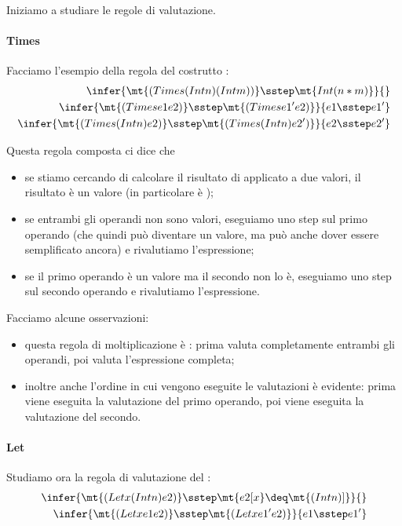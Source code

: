 Iniziamo a studiare le regole di valutazione.
\paragraph{Times} Facciamo l'esempio della regola del costrutto :
\begin{align*}
    \infer{
        \mt{(Times (Int n) (Int m))} \sstep \mt{Int (n * m)}
    }{}\\
    \infer{
        \mt{(Times e1 e2)} \sstep \mt{(Times e1' e2)}
    }{
        e1 \sstep e1'
    }\\
    \infer{
        \mt{(Times (Int n) e2)} \sstep \mt{(Times (Int n) e2')}
    }{
        e2 \sstep e2'
    }
\end{align*}

Questa regola composta ci dice che \begin{itemize}
    \item se stiamo cercando di calcolare il risultato di  applicato a due valori, il risultato è un valore (in particolare è );
    \item se entrambi gli operandi non sono valori, eseguiamo uno step sul primo operando (che quindi può diventare un valore, ma può anche dover essere semplificato ancora) e rivalutiamo l'espressione;
    \item se il primo operando è un valore ma il secondo non lo è, eseguiamo uno step sul secondo operando e rivalutiamo l'espressione.
\end{itemize}
Facciamo alcune osservazioni:
\begin{itemize}
    \item questa regola di moltiplicazione è : prima valuta completamente entrambi gli operandi, poi valuta l'espressione completa;
    \item inoltre anche l'ordine in cui vengono eseguite le valutazioni è evidente: prima viene eseguita la valutazione del primo operando, poi viene eseguita la valutazione del secondo.
\end{itemize}

\paragraph{Let} Studiamo ora la regola di valutazione del :
\begin{align*}
    \infer{
        \mt{(Let x (Int n) e2)} \sstep \mt{e2[x} \deq \mt{(Int n)]}
    }{}\\
    \infer{
        \mt{(Let x e1 e2)} \sstep \mt{(Let x e1' e2)}
    }{
        e1 \sstep e1'
    }\\
\end{align*}

